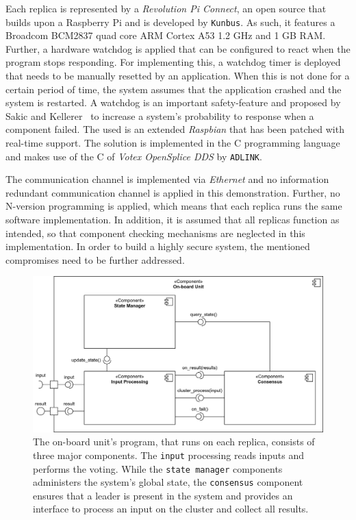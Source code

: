 Each replica is represented by a \textit{Revolution Pi Connect}, an open source  that builds upon a Raspberry Pi and is developed by \texttt{Kunbus}.
As such, it features a Broadcom BCM2837 quad core ARM Cortex A53 1.2 GHz  and 1 GB RAM.
Further, a hardware watchdog is applied that can be configured to react when the program stops responding.
For implementing this, a watchdog timer is deployed that needs to be manually resetted by an application.
When this is not done for a certain period of time, the system assumes that the application crashed and the system is restarted.
A watchdog is an important safety-feature and proposed by Sakic and Kellerer~\cite{SakicTimeInConsensus} to increase a system's probability to response when a component failed.
The used  is an extended \textit{Raspbian}  that has been patched with real-time support.
The solution is implemented in the C programming language and makes use of the C  of \textit{Votex OpenSplice DDS} by \texttt{ADLINK}.

The communication channel is implemented via \textit{Ethernet} and no information redundant communication channel is applied in this demonstration.
Further, no N-version programming is applied, which means that each replica runs the same software implementation.
In addition, it is assumed that all replicas function as intended, so that component checking mechanisms are neglected in this implementation.
In order to build a highly secure system, the mentioned compromises need to be further addressed.

\begin{figure}[!hb]
	\centering
	\includegraphics[width=0.9\linewidth]{images/Components}
	\caption{The on-board unit's program, that runs on each replica, consists of three major components. The \texttt{input} processing reads inputs and performs the voting. While the \texttt{state manager} components administers the system's global state, the \texttt{consensus} component ensures that a leader is present in the system and provides an interface to process an input on the cluster and collect all results.}
	\label{fig:SystemComponents}
\end{figure}

